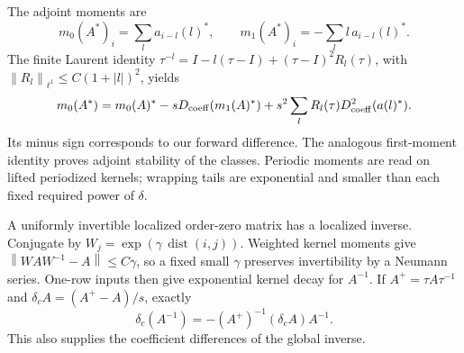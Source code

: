 \documentclass[11pt,a4paper]{article}
\numberwithin{equation}{section}
\theoremstyle{remark}
\newcommand{\norm}[1]{\left\lVert #1\right\rVert}
\begin{document}
The adjoint moments are
\[
 m_0(A^*)_i=\sum_l a_{i-l}(l)^*,\qquad
 m_1(A^*)_i=-\sum_l l\,a_{i-l}(l)^* .
\]
The finite Laurent identity
\(\tau^{-l}=I-l(\tau-I)+(\tau-I)^2R_l(\tau)\), with
\(\norm{R_l}_{\ell^1}\leq C(1+|l|)^2\), yields
\begin{equation}\label{eq:adjoint-moment}
 m_0(A^*)=m_0(A)^*-sD_{\rm coeff}(m_1(A)^*)
       +s^2\sum_lR_l(\tau)D_{\rm coeff}^2(a(l)^*) .
\end{equation}
Its minus sign corresponds to our forward difference. The analogous
first-moment identity proves adjoint stability of the classes.
Periodic moments are read on lifted periodized kernels; wrapping
tails are exponential and smaller than each fixed required power of
\(\delta\).

A uniformly invertible localized order-zero matrix has a localized
inverse. Conjugate by
\(W_j=\exp(\gamma\,\operatorname{dist}(i,j))\). Weighted kernel
moments give \(\norm{WAW^{-1}-A}\leq C\gamma\), so a fixed small
\(\gamma\) preserves invertibility by a Neumann series. One-row inputs
then give exponential kernel decay for \(A^{-1}\). If
\(A^+=\tau A\tau^{-1}\) and \(\delta_c A=(A^+-A)/s\), exactly
\begin{equation}\label{eq:inverse-difference}
 \delta_c(A^{-1})=-(A^+)^{-1}(\delta_c A)A^{-1}.
\end{equation}
This also supplies the coefficient differences of the global inverse.
\end{document}
